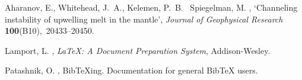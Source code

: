 \documentclass{article}
\begin{document}
%
%

\begin{thebibliography}{xx}

Aharanov, E., Whitehead, J.~A., Kelemen, P.~B. \harvardand\ Spiegelman, M.
  \harvardyearleft 1995\harvardyearright , `Channeling instability of upwelling
  melt in the mantle', {\em Journal of Geophysical Research} {\bf
  100}(B10),~20433--20450.

Lamport, L.  \harvardyearright , {\em {\LaTeX \rm:} {A}
  Document Preparation System}, Addison-Wesley.

Patashnik, O.  \harvardyearright , {{BibTeXing}}.
\newblock Documentation for general BibTeX users.

\end{thebibliography}
\end{document}
